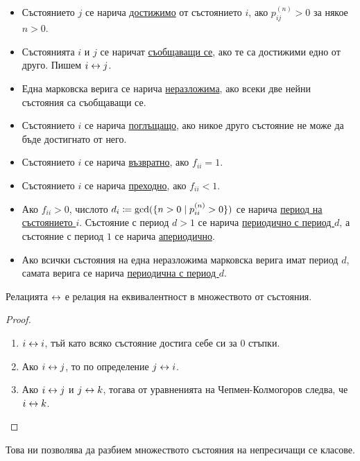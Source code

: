\documentclass[numbers=endperiod, DIV=15, bibliography=totocnumbered]{scrartcl}
\begin{document}
\begin{definition}
  \mbox{}
  \begin{itemize}
    \item Състоянието $j$ се нарича \uline{достижимо} от състоянието $i$, ако $p^{(n)}_{ij} > 0$ за някое $n > 0$.
    \item Състоянията $i$ и $j$ се наричат \uline{съобщаващи се}, ако те са достижими едно от друго. Пишем $i \leftrightarrow j$.
    \item Една марковска верига се нарича \uline{неразложима}, ако всеки две нейни състояния са съобщаващи се.
    \item Състоянието $i$ се нарича \uline{поглъщащо}, ако никое друго състояние не може да бъде достигнато от него.
    \item Състоянието $i$ се нарича \uline{възвратно}, ако $f_{ii} = 1$.
    \item Състоянието $i$ се нарича \uline{преходно}, ако $f_{ii} < 1$.
    \item Ако $f_{ii} > 0$, числото $d_i \coloneqq \operatorname{gcd} (\{ n > 0 \mid p_{ii}^{(n)} > 0 \})$ се нарича \uline{период на състоянието $i$}. Състояние с период $d > 1$ се нарича \uline{периодично с период $d$}, а състояние с период $1$ се нарича \uline{апериодично}.
    \item Ако всички състояния на една неразложима марковска верига имат период $d$, самата верига се нарича \uline{периодична с период $d$}.
  \end{itemize}
\end{definition}

\begin{proposition}
  Релацията $\leftrightarrow$ е релация на еквивалентност в множеството от състояния.
\end{proposition}
\begin{proof}
  \mbox{}
  \begin{enumerate}
    \item $i \leftrightarrow i$, тъй като всяко състояние достига себе си за $0$ стъпки.
    \item Ако $i \leftrightarrow j$, то по определение $j \leftrightarrow i$.
    \item Ако $i \leftrightarrow j$ и $j \leftrightarrow k$, тогава от уравненията на Чепмен-Колмогоров следва, че $i \leftrightarrow k$.
  \end{enumerate}
\end{proof}

Това ни позволява да разбием множеството състояния на непресичащи се класове.
\end{document}

